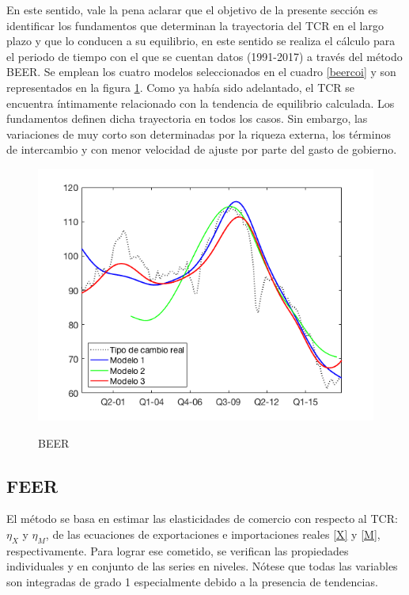 \documentclass[12pt,letterpaper]{article}
\begin{document}
En este sentido, vale la pena aclarar que el objetivo de la presente sección es identificar los fundamentos que determinan la trayectoria del TCR en el largo plazo y que lo conducen a su equilibrio, en este sentido se realiza el cálculo para el periodo de tiempo con el que se cuentan datos (1991-2017) a través del método BEER. Se emplean los cuatro modelos seleccionados en el cuadro \ref{beercoi} y son representados en la figura \ref{beergraf}. Como ya había sido adelantado, el TCR se encuentra íntimamente relacionado con la tendencia de equilibrio calculada. Los fundamentos definen dicha trayectoria en todos los casos. Sin embargo, las variaciones de muy corto son determinadas por la riqueza externa, los términos de intercambio y con menor velocidad de ajuste por parte del gasto de gobierno.

\begin{figure}
\centering
\caption{BEER}
\includegraphics[scale=0.6]{fig19}
\label{beergraf}
\end{figure}

\subsection*{FEER}

El método se basa en estimar las elasticidades de comercio con respecto al TCR: $\eta_X$ y $\eta_M$, de las ecuaciones de exportaciones e importaciones reales \ref{X} y \ref{M}, respectivamente. Para lograr ese cometido, se verifican las propiedades individuales y en conjunto de las series en niveles. Nótese que todas las variables son integradas de grado 1 especialmente debido a la presencia de tendencias.
\end{document}
